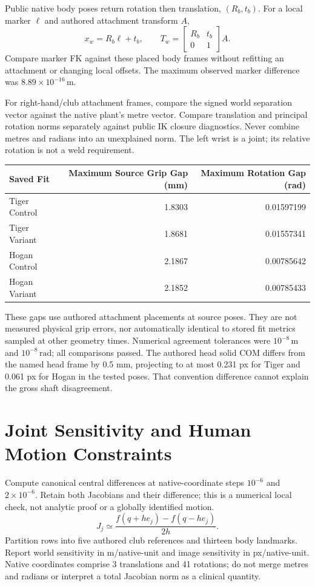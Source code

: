 \documentclass[11pt,letterpaper]{article}
\newcommand{\chapterpage}[1]{\clearpage\section{#1}}
\begin{document}
Public native body poses return rotation then translation, $(R_b,t_b)$.
For a local marker $\ell$ and authored attachment transform $A$,
\[
x_w=R_b\ell+t_b,\qquad T_w=\begin{bmatrix}R_b&t_b\\0&1\end{bmatrix}A.
\]
Compare marker FK against these placed body frames without refitting an
attachment or changing local offsets. The maximum observed marker difference
was $8.89\times10^{-16}\,\mathrm{m}$.

For right-hand/club attachment frames, compare the signed world separation
vector against the native plant's metre vector. Compare translation and
principal rotation norms separately against public IK closure diagnostics.
Never combine metres and radians into an unexplained norm. The left wrist is a
joint; its relative rotation is not a weld requirement.

\par\smallskip
\begin{tabular}{@{}lrr@{}}\toprule
Saved Fit & Maximum Source Grip Gap (mm) & Maximum Rotation Gap (rad)\\\midrule
Tiger Control & 1.8303 & 0.01597199\\
Tiger Variant & 1.8681 & 0.01557341\\
Hogan Control & 2.1867 & 0.00785642\\
Hogan Variant & 2.1852 & 0.00785433\\
\bottomrule\end{tabular}

These gaps use authored attachment placements at source poses. They are not
measured physical grip errors, nor automatically identical to stored fit
metrics sampled at other geometry times. Numerical agreement tolerances were
$10^{-8}\,\mathrm{m}$ and $10^{-8}\,\mathrm{rad}$; all comparisons passed.
The authored head solid COM differs from the named head frame by 0.5 mm,
projecting to at most 0.231 px for Tiger and 0.061 px for Hogan in the tested
poses. That convention difference cannot explain the gross shaft disagreement.
\chapterpage{Joint Sensitivity and Human Motion Constraints}
Compute canonical central differences at native-coordinate steps $10^{-6}$
and $2\times10^{-6}$. Retain both Jacobians and their difference; this is a
numerical local check, not analytic proof or a globally identified motion.
\[
J_j\simeq\frac{f(q+h e_j)-f(q-h e_j)}{2h}.
\]
Partition rows into five authored club references and thirteen body landmarks.
Report world sensitivity in m/native-unit and image sensitivity in px/native-unit.
Native coordinates comprise 3 translations and 41 rotations; do not merge
metres and radians or interpret a total Jacobian norm as a clinical quantity.
\end{document}
